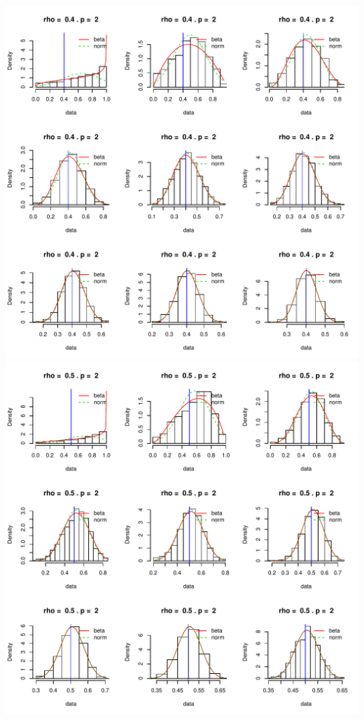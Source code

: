 \documentclass[]{article}
\begin{document}
\includegraphics{2016_w09_files/figure-latex/unnamed-chunk-14-5.pdf}
\includegraphics{2016_w09_files/figure-latex/unnamed-chunk-14-6.pdf}
\end{document}
